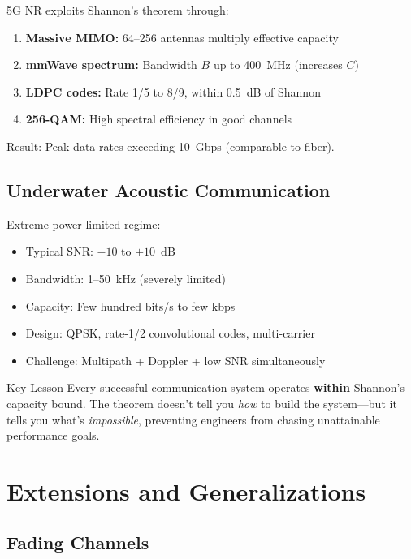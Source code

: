 5G NR exploits Shannon's theorem through:

\begin{enumerate}
\item \textbf{Massive MIMO:} 64--256 antennas multiply effective capacity
\item \textbf{mmWave spectrum:} Bandwidth $B$ up to 400~MHz (increases $C$)
\item \textbf{LDPC codes:} Rate 1/5 to 8/9, within 0.5~dB of Shannon
\item \textbf{256-QAM:} High spectral efficiency in good channels
\end{enumerate}

Result: Peak data rates exceeding 10~Gbps (comparable to fiber).

\subsection{Underwater Acoustic Communication}

Extreme power-limited regime:

\begin{itemize}
\item Typical SNR: $-10$ to $+10$~dB
\item Bandwidth: 1--50~kHz (severely limited)
\item Capacity: Few hundred bits/s to few kbps
\item Design: QPSK, rate-1/2 convolutional codes, multi-carrier
\item Challenge: Multipath + Doppler + low SNR simultaneously
\end{itemize}

\begin{calloutbox}{Key Lesson}
Every successful communication system operates \textbf{within} Shannon's capacity bound. The theorem doesn't tell you \textit{how} to build the system---but it tells you what's \textit{impossible}, preventing engineers from chasing unattainable performance goals.
\end{calloutbox}

\section{Extensions and Generalizations}

\subsection{Fading Channels}

